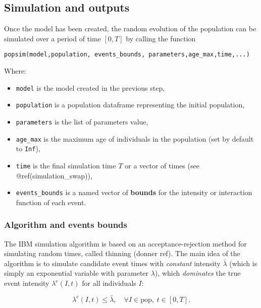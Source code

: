 \hypertarget{simulation}{%
\subsection{Simulation and outputs}\label{simulation}}

Once the model has been created, the random evolution of the population can be simulated over a period of time \([0,T]\) by calling the function

\begin{verbatim}
popsim(model,population, events_bounds, parameters,age_max,time,...)
\end{verbatim}

Where:

\begin{itemize}
\tightlist
\item
  \texttt{model} is the model created in the previous step,
\item
  \texttt{population} is a population dataframe representing the initial population,
\item
  \texttt{parameters} is the list of parameters value,
\item
  \texttt{age\_max} is the maximum age of individuals in the population (set by default to \texttt{Inf}),
\item
  \texttt{time} is the final simulation time \(T\) or a vector of times (see @ref(simulation\_swap)),
\item
  \texttt{events\_bounds} is a named vector of \textbf{bounds} for the intensity or interaction function of each event.
\end{itemize}

\hypertarget{algorithm-and-events-bounds}{%
\subsubsection{Algorithm and events bounds}\label{algorithm-and-events-bounds}}

The IBM simulation algorithm is based on an acceptance-rejection method for simulating random times, called thinning ({donner ref}). The main idea of the algorithm is to simulate candidate event times with \emph{constant} intensity \(\bar \lambda\) (which is simply an exponential variable with parameter \(\lambda\)), which \emph{dominates} the true event intensity \(\lambda^e(I,t)\) for all individuals \(I\):

\begin{equation}
\lambda^e(I,t) \leq \bar{\lambda}, \quad \forall I \in \text{pop}, \; t \in [0,T].
\end{equation}

